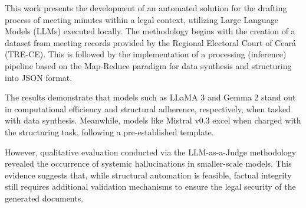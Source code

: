 This work presents the development of an automated solution for the drafting process of meeting minutes within a legal context, utilizing Large Language Models (LLMs) executed locally. The methodology begins with the creation of a dataset from meeting records provided by the Regional Electoral Court of Ceará (TRE-CE). This is followed by the implementation of a processing (inference) pipeline based on the Map-Reduce paradigm for data synthesis and structuring into JSON format.

The results demonstrate that models such as LLaMA 3 and Gemma 2 stand out in computational efficiency and structural adherence, respectively, when tasked with data synthesis. Meanwhile, models like Mistral v0.3 excel when charged with the structuring task, following a pre-established template.

However, qualitative evaluation conducted via the LLM-as-a-Judge methodology revealed the occurrence of systemic hallucinations in smaller-scale models. This evidence suggests that, while structural automation is feasible, factual integrity still requires additional validation mechanisms to ensure the legal security of the generated documents.

